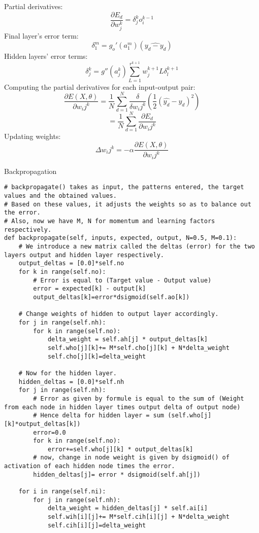 \documentclass{article}
\begin{document}
Partial derivatives:
$$\frac{\partial{E_d}}{\partial{w_j^k}} = \delta_j^k o_i^{k-1}$$
Final layer's error term:
$$\delta_1^m = g_o'(a_1^m)(\hat{y_d-y_d})$$
Hidden layers' error terms:
$$\delta_j^k = g''(a_j^k)\sum_{L=1}^{r^{k+1}}w^{k+1}_jL\delta_l^{k+1}$$
Computing the partial derivatives for each input-output pair:
    $$\frac{\partial{E(X,\theta)}}{\partial{w_ij^k}}= \frac{1}{N}\sum_{d=1}^{N}\frac{\delta}{\delta w_ij^k}(\frac{1}{2}(\hat{y_d}-y_d)^2)$$
    $$ = \frac{1}{N}\sum_{d=1}^{N}\frac{\partial{E_d}}{\partial{w_ij^k}}$$
Updating weights:
$$ \Delta w_ij^k = -\alpha \frac{\partial{E(X,\theta)}}{\partial{w_ij^k}}$$
\begin{algorithm}
\caption{Backpropagation}
\begin{algorithmic}[1]
            \EndFor
            \EndFor
\EndFunction
\end{algorithmic}
\end{algorithm}
\clearpage
\begin{lstlisting}
# backpropagate() takes as input, the patterns entered, the target values and the obtained values.
# Based on these values, it adjusts the weights so as to balance out the error.
# Also, now we have M, N for momentum and learning factors respectively.
def backpropagate(self, inputs, expected, output, N=0.5, M=0.1):
	# We introduce a new matrix called the deltas (error) for the two layers output and hidden layer respectively.
	output_deltas = [0.0]*self.no
	for k in range(self.no):
		# Error is equal to (Target value - Output value)
		error = expected[k] - output[k]
		output_deltas[k]=error*dsigmoid(self.ao[k])

	# Change weights of hidden to output layer accordingly.
	for j in range(self.nh):
		for k in range(self.no):
			delta_weight = self.ah[j] * output_deltas[k]
			self.who[j][k]+= M*self.cho[j][k] + N*delta_weight
			self.cho[j][k]=delta_weight

	# Now for the hidden layer.
	hidden_deltas = [0.0]*self.nh
	for j in range(self.nh):
		# Error as given by formule is equal to the sum of (Weight from each node in hidden layer times output delta of output node)
		# Hence delta for hidden layer = sum (self.who[j][k]*output_deltas[k])
		error=0.0
		for k in range(self.no):
			error+=self.who[j][k] * output_deltas[k]
		# now, change in node weight is given by dsigmoid() of activation of each hidden node times the error.
		hidden_deltas[j]= error * dsigmoid(self.ah[j])

	for i in range(self.ni):
		for j in range(self.nh):
			delta_weight = hidden_deltas[j] * self.ai[i]
			self.wih[i][j]+= M*self.cih[i][j] + N*delta_weight
			self.cih[i][j]=delta_weight
\end{lstlisting}
\clearpage
\end{document}
